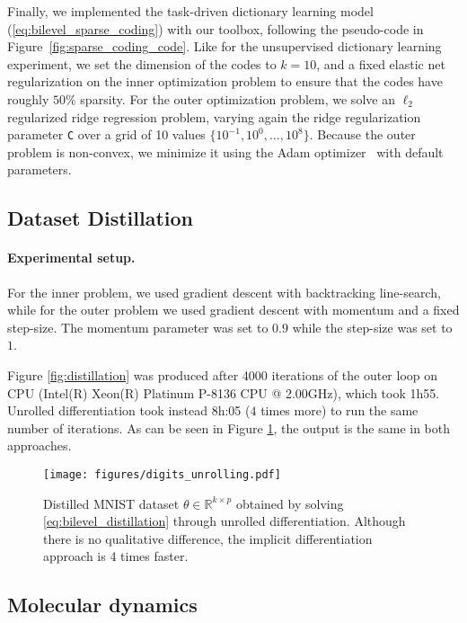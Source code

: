 \documentclass{article}
\def\RR{{\mathbb R}}
\begin{document}
Finally, we implemented the task-driven dictionary learning model
(\ref{eq:bilevel_sparse_coding}) with our toolbox, following the pseudo-code in
Figure~\ref{fig:sparse_coding_code}. Like for the unsupervised dictionary
learning experiment, we set the dimension of the codes to $k=10$, and a fixed
elastic net regularization on the inner optimization problem to ensure that the
codes have roughly $50\%$ sparsity. For the outer optimization problem, we solve
an $\ell_2$ regularized ridge regression problem, varying again the ridge
regularization parameter \texttt{C} over a grid of 10 values $\{10^{-1}, 10^{0},
\ldots, 10^8\}$. Because the outer problem is non-convex, we minimize it using
the Adam optimizer~\cite{kingma2014adam} with default parameters.

\subsection{Dataset Distillation}

\paragraph{Experimental setup.}
For the inner problem, we used gradient descent with backtracking line-search, while for the outer problem we used gradient descent with momentum and a fixed step-size. The momentum parameter was set to $0.9$ while the step-size was set to $1$. 

Figure \ref{fig:distillation} was produced after 4000 iterations of the outer
loop on CPU (Intel(R) Xeon(R) Platinum P-8136 CPU @ 2.00GHz), which took 1h55.
Unrolled differentiation took instead 8h:05 ($4$ times more) to run the same
number of iterations. As can be seen in Figure \ref{fig:distillation2}, the output
is the same in both approaches.

\begin{figure}[H]
\texttt{[image: figures/digits\_unrolling.pdf]}
\caption{Distilled MNIST dataset $\theta \in \RR^{k \times p}$ obtained by
    solving \eqref{eq:bilevel_distillation} through unrolled differentiation. Although there is no qualitative difference, the implicit differentiation approach is 4 times faster.}
\label{fig:distillation2}
\end{figure}

\subsection{Molecular dynamics}
\end{document}
